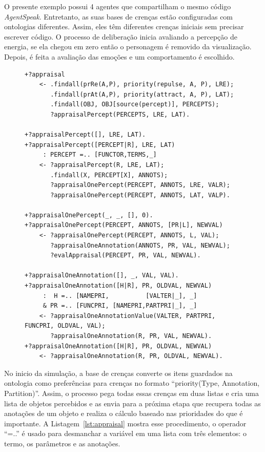 O presente exemplo possui 4 agentes que compartilham o mesmo código
\emph{AgentSpeak}. Entretanto, as suas bases de crenças estão configuradas com
ontologias diferentes. Assim, eles têm diferentes crenças iniciais sem
precisar escrever código. O processo de deliberação inicia avaliando a
percepção de energia, se ela chegou em zero então o personagem é removido da
visualização. Depois, é feita a avaliação das emoções e um comportamento é
escolhido.

\begin{figure}
\begin{center}
    \begin{minipage}{130mm}
	\lstset{linewidth=130mm}
	\begin{lstlisting}[frame=trbl,
caption=Amostra de código referente ao processo de avaliação considerando as
preferências.,
label=lst:appraisal]
+?appraisal
    <- .findall(prRe(A,P), priority(repulse, A, P), LRE);
       .findall(prAt(A,P), priority(attract, A, P), LAT);
       .findall(OBJ, OBJ[source(percept)], PERCEPTS);
       ?appraisalPercept(PERCEPTS, LRE, LAT).

+?appraisalPercept([], LRE, LAT).
+?appraisalPercept([PERCEPT|R], LRE, LAT)
     : PERCEPT =.. [FUNCTOR,TERMS,_]
    <- ?appraisalPercept(R, LRE, LAT);
       .findall(X, PERCEPT[X], ANNOTS);
       ?appraisalOnePercept(PERCEPT, ANNOTS, LRE, VALR);
       ?appraisalOnePercept(PERCEPT, ANNOTS, LAT, VALP).

+?appraisalOnePercept(_, _, [], 0).
+?appraisalOnePercept(PERCEPT, ANNOTS, [PR|L], NEWVAL)
    <- ?appraisalOnePercept(PERCEPT, ANNOTS, L, VAL);
       ?appraisalOneAnnotation(ANNOTS, PR, VAL, NEWVAL);
       ?evalAppraisal(PERCEPT, PR, VAL, NEWVAL).

+?appraisalOneAnnotation([], _, VAL, VAL).
+?appraisalOneAnnotation([H|R], PR, OLDVAL, NEWVAL)
     :  H =.. [NAMEPRI,          [VALTER|_], _]
     & PR =.. [FUNCPRI, [NAMEPRI,PARTPRI|_], _]
    <- ?appraisalOneAnnotationValue(VALTER, PARTPRI, FUNCPRI, OLDVAL, VAL);
       ?appraisalOneAnnotation(R, PR, VAL, NEWVAL).
+?appraisalOneAnnotation([H|R], PR, OLDVAL, NEWVAL)
    <- ?appraisalOneAnnotation(R, PR, OLDVAL, NEWVAL).
	\end{lstlisting}
    \end{minipage}
\end{center}
\end{figure}

No inicio da simulação, a base de crenças converte os itens guardados na
ontologia como preferências para crenças no formato ``priority(Type,
Annotation, Partition)''. Assim, o processo pega todas essas crenças em duas listas
e cria uma lista de objetos percebidos e as envia para a próxima etapa
que recupera todas as anotações de um objeto e realiza o cálculo baseado nas
prioridades do que é importante. A Listagem~\ref{lst:appraisal} mostra esse
procedimento, o operador ``=..'' é usado para desmanchar a variável em uma
lista com três elementos: o termo, os parâmetros e as anotações.

